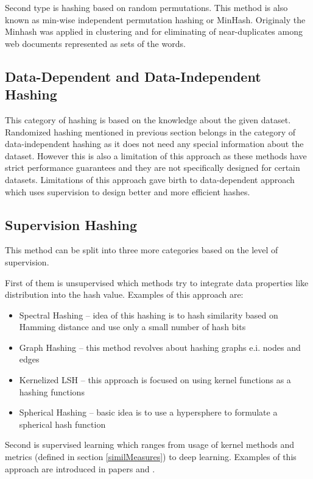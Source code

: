 Second type is hashing based on random permutations. This method is also known as min-wise independent permutation hashing or MinHash. Originaly the Minhash was applied in clustering and for eliminating of near-duplicates among web documents represented as sets of the words. \cite{minhashuse}

\subsection{Data-Dependent and Data-Independent Hashing}
This category of hashing is based on the knowledge about the given dataset. Randomized hashing mentioned in previous section belongs in the category of data-independent hashing as it does not need any special information about the dataset. However this is also a limitation of this approach as these methods have strict performance guarantees and they are not specifically designed for certain datasets. Limitations of this approach gave birth to data-dependent approach which uses supervision to design better and more efficient hashes. \cite{learnHash} 

\subsection{Supervision Hashing}
This method can be split into three more categories based on the level of supervision.

First of them is unsupervised which methods try to integrate data properties like distribution into the hash value. Examples of this approach are: 
\begin{itemize}
\item Spectral Hashing -- idea of this hashing is to hash similarity based on Hamming distance and use only a small number of hash bits
\item Graph Hashing -- this method revolves about hashing graphs e.i. nodes and edges
\item Kernelized LSH -- this approach is focused on using kernel functions as a hashing functions
\item Spherical Hashing -- basic idea is to use a hypersphere to formulate a spherical hash function
\end{itemize}

Second is supervised learning which ranges from usage of kernel methods and metrics (defined in section \ref{similMeasures}) to deep learning. Examples of this approach are introduced in papers \cite{LM1} and 
\cite{LM2}.

